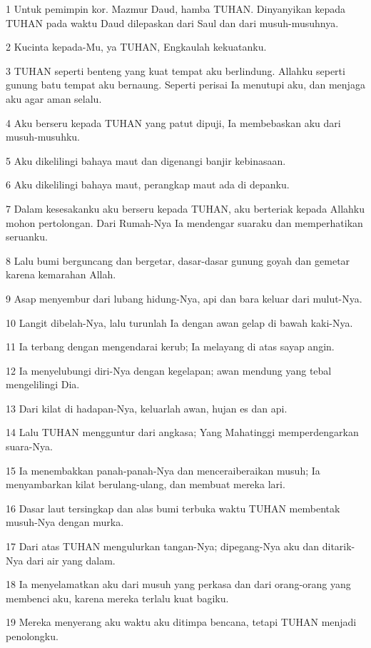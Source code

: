 \par 1 Untuk pemimpin kor. Mazmur Daud, hamba TUHAN. Dinyanyikan kepada TUHAN pada waktu Daud dilepaskan dari Saul dan dari musuh-musuhnya.
\par 2 Kucinta kepada-Mu, ya TUHAN, Engkaulah kekuatanku.
\par 3 TUHAN seperti benteng yang kuat tempat aku berlindung. Allahku seperti gunung batu tempat aku bernaung. Seperti perisai Ia menutupi aku, dan menjaga aku agar aman selalu.
\par 4 Aku berseru kepada TUHAN yang patut dipuji, Ia membebaskan aku dari musuh-musuhku.
\par 5 Aku dikelilingi bahaya maut dan digenangi banjir kebinasaan.
\par 6 Aku dikelilingi bahaya maut, perangkap maut ada di depanku.
\par 7 Dalam kesesakanku aku berseru kepada TUHAN, aku berteriak kepada Allahku mohon pertolongan. Dari Rumah-Nya Ia mendengar suaraku dan memperhatikan seruanku.
\par 8 Lalu bumi berguncang dan bergetar, dasar-dasar gunung goyah dan gemetar karena kemarahan Allah.
\par 9 Asap menyembur dari lubang hidung-Nya, api dan bara keluar dari mulut-Nya.
\par 10 Langit dibelah-Nya, lalu turunlah Ia dengan awan gelap di bawah kaki-Nya.
\par 11 Ia terbang dengan mengendarai kerub; Ia melayang di atas sayap angin.
\par 12 Ia menyelubungi diri-Nya dengan kegelapan; awan mendung yang tebal mengelilingi Dia.
\par 13 Dari kilat di hadapan-Nya, keluarlah awan, hujan es dan api.
\par 14 Lalu TUHAN mengguntur dari angkasa; Yang Mahatinggi memperdengarkan suara-Nya.
\par 15 Ia menembakkan panah-panah-Nya dan menceraiberaikan musuh; Ia menyambarkan kilat berulang-ulang, dan membuat mereka lari.
\par 16 Dasar laut tersingkap dan alas bumi terbuka waktu TUHAN membentak musuh-Nya dengan murka.
\par 17 Dari atas TUHAN mengulurkan tangan-Nya; dipegang-Nya aku dan ditarik-Nya dari air yang dalam.
\par 18 Ia menyelamatkan aku dari musuh yang perkasa dan dari orang-orang yang membenci aku, karena mereka terlalu kuat bagiku.
\par 19 Mereka menyerang aku waktu aku ditimpa bencana, tetapi TUHAN menjadi penolongku.
